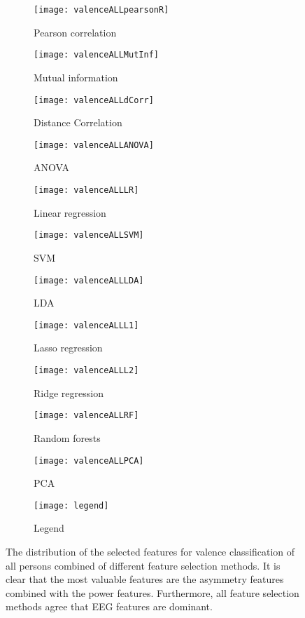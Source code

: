 \begin{figure}[!tbp]
  \centering
  \begin{subfigure}[b]{0.3\textwidth}
    \texttt{[image: valenceALLpearsonR]}
    \caption{Pearson correlation}
  \end{subfigure}
  \hfill
  \begin{subfigure}[b]{0.3\textwidth}
    \texttt{[image: valenceALLMutInf]}
    \caption{Mutual information}
  \end{subfigure}
  \hfill
  \begin{subfigure}[b]{0.3\textwidth}
    \texttt{[image: valenceALLdCorr]}
    \caption{Distance Correlation}
  \end{subfigure}
  
  \begin{subfigure}[b]{0.3\textwidth}
    \texttt{[image: valenceALLANOVA]}
    \caption{ANOVA}
  \end{subfigure}
  \hfill
  \begin{subfigure}[b]{0.3\textwidth}
    \texttt{[image: valenceALLLR]}
    \caption{Linear regression}
  \end{subfigure}
  \hfill
  \begin{subfigure}[b]{0.3\textwidth}
    \texttt{[image: valenceALLSVM]}
    \caption{SVM}
  \end{subfigure}
  
  \begin{subfigure}[b]{0.3\textwidth}
    \texttt{[image: valenceALLLDA]}
    \caption{LDA}
  \end{subfigure}
  \hfill
  \begin{subfigure}[b]{0.3\textwidth}
    \texttt{[image: valenceALLL1]}
    \caption{Lasso regression}
  \end{subfigure}
  \hfill
  \begin{subfigure}[b]{0.3\textwidth}
    \texttt{[image: valenceALLL2]}
    \caption{Ridge regression}
  \end{subfigure}
  
  \begin{subfigure}[b]{0.3\textwidth}
    \texttt{[image: valenceALLRF]}
    \caption{Random forests}
  \end{subfigure}
  \hfill
  \begin{subfigure}[b]{0.3\textwidth}
    \texttt{[image: valenceALLPCA]}
    \caption{PCA}
  \end{subfigure}
  \hfill
  \begin{subfigure}[b]{0.3\textwidth}
    \texttt{[image: legend]}
    \caption{Legend\label{valencepieslegend}}
  \end{subfigure}
\caption{The distribution of the selected features for valence classification of all persons combined of different feature selection methods. It is clear that the most valuable features are the asymmetry features combined with the power features. Furthermore, all feature selection methods agree that EEG features are dominant.\label{valencepies}}
\end{figure}
\clearpage

